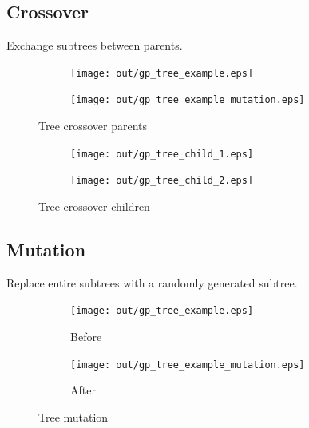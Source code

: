 \documentclass[a4paper]{article}
\begin{document}
\subsection{Crossover}

Exchange subtrees between parents.


\begin{figure}[h]
  \centering
  \begin{subfigure}[t!]{0.4\textwidth}
    \texttt{[image: out/gp\_tree\_example.eps]}
  \end{subfigure}
  \begin{subfigure}[t!]{0.4\textwidth}
    \texttt{[image: out/gp\_tree\_example\_mutation.eps]}
  \end{subfigure}
  \caption{Tree crossover parents}
  \label{fig:gp_crossover_parents}
\end{figure}
\FloatBarrier

\begin{figure}[h]
  \centering
  \begin{subfigure}[t!]{0.4\textwidth}
    \texttt{[image: out/gp\_tree\_child\_1.eps]}
  \end{subfigure}
  \begin{subfigure}[t!]{0.4\textwidth}
    \texttt{[image: out/gp\_tree\_child\_2.eps]}
  \end{subfigure}
  \caption{Tree crossover children}
  \label{fig:gp_crossover_children}
\end{figure}
\FloatBarrier

\subsection{Mutation}

Replace entire subtrees with a randomly generated subtree.


\begin{figure}[h]
  \centering
  \begin{subfigure}[t!]{0.4\textwidth}
    \texttt{[image: out/gp\_tree\_example.eps]}
    \caption{Before}
  \end{subfigure}
  \begin{subfigure}[t!]{0.4\textwidth}
    \texttt{[image: out/gp\_tree\_example\_mutation.eps]}
    \caption{After}
  \end{subfigure}
  \caption{Tree mutation}
  \label{fig:gp_mutation}
\end{figure}
\FloatBarrier
\end{document}
